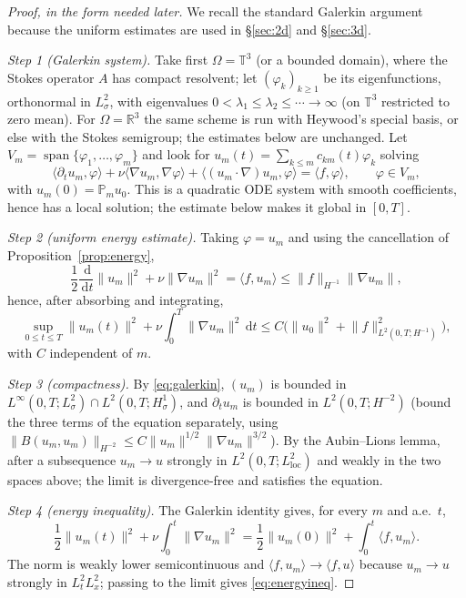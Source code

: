\documentclass[11pt]{article}
\theoremstyle{remark}
\newcommand{\R}{\mathbb{R}}
\newcommand{\T}{\mathbb{T}}
\newcommand{\dd}{\,\mathrm{d}}
\newcommand{\norm}[1]{\lVert #1\rVert}
\newcommand{\ip}[2]{\langle #1,#2\rangle}
\newcommand{\Leray}{\mathbb{P}}
\begin{document}
\begin{proof}[Proof, in the form needed later]
We recall the standard Galerkin argument because the uniform estimates are used in
\S\ref{sec:2d} and \S\ref{sec:3d}.

\emph{Step 1 (Galerkin system).} Take first $\Omega=\T^3$ (or a bounded domain), where the
Stokes operator $A$ has compact resolvent; let $(\varphi_k)_{k\ge1}$ be its eigenfunctions,
orthonormal in $L^2_\sigma$, with eigenvalues
$0<\lambda_1\le\lambda_2\le\cdots\to\infty$ (on $\T^3$ restricted to zero mean). For
$\Omega=\R^3$ the same scheme is run with Heywood's special basis, or else with the Stokes
semigroup; the estimates below are unchanged. Let
$V_m=\operatorname{span}\{\varphi_1,\dots,\varphi_m\}$ and look for
$u_m(t)=\sum_{k\le m}c_{km}(t)\varphi_k$ solving
\[
\ip{\partial_tu_m}{\varphi}+\nu\ip{\nabla u_m}{\nabla\varphi}
+\ip{(u_m\cdot\nabla)u_m}{\varphi}=\ip{f}{\varphi},
\qquad \varphi\in V_m,
\]
with $u_m(0)=\Leray_m u_0$. This is a quadratic ODE system with smooth coefficients, hence
has a local solution; the estimate below makes it global in $[0,T]$.

\emph{Step 2 (uniform energy estimate).} Taking $\varphi=u_m$ and using the cancellation of
Proposition~\ref{prop:energy},
\[
\frac12\frac{\dd}{\dd t}\norm{u_m}^2+\nu\norm{\nabla u_m}^2=\ip{f}{u_m}
\le\norm{f}_{H^{-1}}\norm{\nabla u_m},
\]
hence, after absorbing and integrating,
\begin{equation}\label{eq:galerkin}
\sup_{0\le t\le T}\norm{u_m(t)}^2+\nu\int_0^T\norm{\nabla u_m}^2\dd t
\le C\bigl(\norm{u_0}^2+\norm{f}_{L^2(0,T;H^{-1})}^2\bigr),
\end{equation}
with $C$ independent of $m$.

\emph{Step 3 (compactness).} By \eqref{eq:galerkin}, $(u_m)$ is bounded in
$L^\infty(0,T;L^2_\sigma)\cap L^2(0,T;H^1_\sigma)$, and $\partial_tu_m$ is bounded in
$L^2(0,T;H^{-2})$ (bound the three terms of the equation separately, using
$\norm{B(u_m,u_m)}_{H^{-2}}\le C\norm{u_m}^{1/2}\norm{\nabla u_m}^{3/2}$). By the Aubin--Lions lemma,
after a subsequence $u_m\to u$ strongly in $L^2(0,T;L^2_{\mathrm{loc}})$ and weakly in the
two spaces above; the limit is divergence-free and satisfies the equation.

\emph{Step 4 (energy inequality).} The Galerkin identity gives, for every $m$ and a.e.\ $t$,
\[
\frac12\norm{u_m(t)}^2+\nu\int_0^t\norm{\nabla u_m}^2
=\frac12\norm{u_m(0)}^2+\int_0^t\ip{f}{u_m}.
\]
The norm is weakly lower semicontinuous and $\ip{f}{u_m}\to\ip{f}{u}$ because
$u_m\to u$ strongly in $L^2_tL^2_x$; passing to the limit gives \eqref{eq:energyineq}.
\end{proof}
\end{document}
